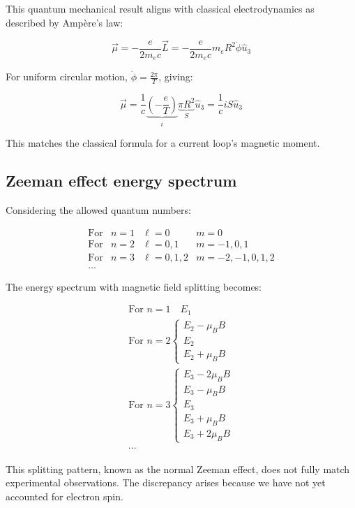 \documentclass[italian]{HKNdocument}
\begin{document}
This quantum mechanical result aligns with classical electrodynamics as described by Ampère's law:

\begin{equation}
\vec{\mu}=-\frac{e}{2m_e c}\vec{L}=-\frac{e}{2m_e c}m_e R^2\dot{\phi}\hat{u}_3
\end{equation}

For uniform circular motion, $\dot{\phi}=\frac{2\pi}{T}$, giving:

\begin{equation}
\vec{\mu}=\frac{1}{c}\underbrace{\left(-\frac{e}{T}\right)}_i \underbrace{\pi R^2}_S \hat{u}_3=\frac{1}{c}iS\hat{u}_3
\end{equation}

This matches the classical formula for a current loop's magnetic moment.

\subsection{Zeeman effect energy spectrum}
Considering the allowed quantum numbers:

$$
\begin{array}{llll}
\text{For} & n=1 & \ell=0 & m=0 \\
\text{For} & n=2 & \ell=0,1 & m=-1,0,1 \\
\text{For} & n=3 & \ell=0,1,2 & m=-2,-1,0,1,2 \\
\ldots & & &
\end{array}
$$

The energy spectrum with magnetic field splitting becomes:

\begin{gather}
\text{For } n=1 \quad E_1 \\
\text{For } n=2\left\{\begin{array}{l}
E_2-\mu_B B \\
E_2 \\
E_2+\mu_B B
\end{array}\right. \\
\text{For } n=3\left\{\begin{array}{l}
E_3-2\mu_B B \\
E_3-\mu_B B \\
E_3 \\
E_3+\mu_B B \\
E_3+2\mu_B B
\end{array}\right. \\
\cdots
\end{gather}

This splitting pattern, known as the normal Zeeman effect, does not fully match experimental observations. The discrepancy arises because we have not yet accounted for electron spin.
\end{document}
